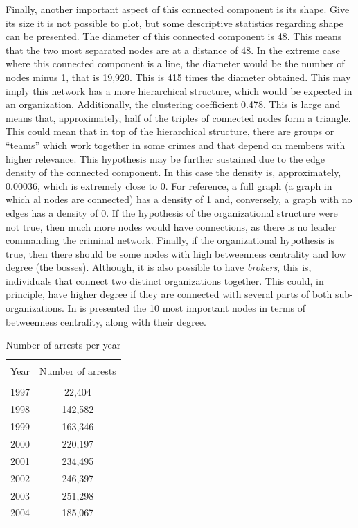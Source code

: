 \documentclass[11pt, english]{article}
\begin{document}
\begin{multicols}{2}
Finally, another important aspect of this connected component is its shape. Give its size it is not possible to plot, but some descriptive statistics regarding shape can be presented. The diameter of this connected component is 48. This means that the two most separated nodes are at a distance of 48. In the extreme case where this connected component is a line, the diameter would be the number of nodes minus 1, that is 19,920. This is 415 times the diameter obtained. This may imply this network has a more hierarchical structure, which would be expected in an organization. Additionally, the clustering coefficient 0.478. This is large and means that, approximately, half of the triples of connected nodes form a triangle. This could mean that in top of the hierarchical structure, there are groups or ``teams'' which work together in some crimes and that depend on members with higher relevance. This hypothesis may be further sustained due to the edge density of the connected component. In this case the density is, approximately, 0.00036, which is extremely close to 0. For reference, a full graph (a graph in which al nodes are connected) has a density of 1 and, conversely, a graph with no edges has a density of 0. If the hypothesis of the organizational structure were not true, then much more nodes would have connections, as there is no leader commanding the criminal network. Finally, if the organizational hypothesis is true, then there should be some nodes with high betweenness centrality and low degree (the bosses). Although, it is also possible to have \textit{brokers}, this is, individuals that connect two distinct organizations together. This could, in principle, have higher degree if they are connected with several parts of both sub-organizations. In  is presented the 10 most important nodes in terms of betweenness centrality, along with their degree.

\begin{table}
	\caption{Number of arrests per year}
	\label{tab:crimes-per-year}
	\centering
	\begin{tabular}{cc}
		\hline\hline
		\\[-1.5ex]
		Year	&	Number of arrests	\\[0.5ex]\hline
		\\[-1.5ex]
		1997	&	\hspace{1ex}22,404	\\[0.2ex]
		1998	&	142,582				\\[0.2ex]
		1999	&	163,346				\\[0.2ex]
		2000	&	220,197				\\[0.2ex]
		2001	&	234,495				\\[0.2ex]
		2002	&	246,397				\\[0.2ex]
		2003	&	251,298				\\[0.2ex]
		2004	&	185,067				\\[0.5ex]
		\hline\hline
	\end{tabular}
	


\end{table}
\end{multicols}
\end{document}
